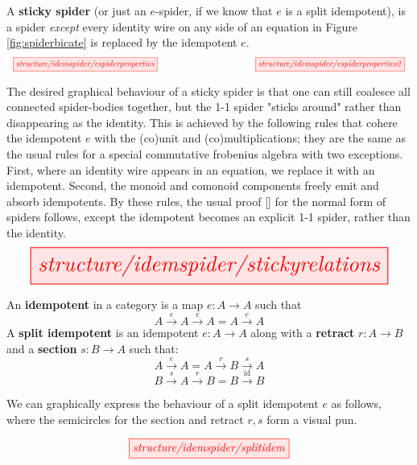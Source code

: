 \begin{myboxB}
\begin{defn}\label{defn:stickyspider}
A \textbf{sticky spider} (or just an $e$-spider, if we know that $e$ is a split idempotent), is a spider \emph{except} every identity wire on any side of an equation in Figure \ref{fig:spiderbicate} is replaced by the idempotent $e$.
\[\scalebox{0.75}{\tikzfig{structure/idemspider/espiderproperties}} \qquad\qquad\qquad\qquad \scalebox{0.75}{\tikzfig{structure/idemspider/espiderproperties2}}\]
\end{defn}

The desired graphical behaviour of a sticky spider is that one can still coalesce all connected spider-bodies together, but the 1-1 spider "sticks around" rather than disappearing as the identity. This is achieved by the following rules that cohere the idempotent $e$ with the (co)unit and (co)multiplications; they are the same as the usual rules for a special commutative frobenius algebra with two exceptions. First, where an identity wire appears in an equation, we replace it with an idempotent. Second, the monoid and comonoid components freely emit and absorb idempotents. By these rules, the usual proof [] for the normal form of spiders follows, except the idempotent becomes an explicit 1-1 spider, rather than the identity.
\[\resizebox{\textwidth}{!}{\tikzfig{structure/idemspider/stickyrelations}}\]
\end{myboxB}

\begin{myboxR}

\begin{rem}
An \textbf{idempotent} in a category is a map $e: A \rightarrow A$ such that \[A \overset{e}{\rightarrow} A \overset{e}{\rightarrow} A = A \overset{e}{\rightarrow} A\]
A \textbf{split idempotent} is an idempotent $e: A \rightarrow A$ along with a \textbf{retract} $r: A \rightarrow B$ and a \textbf{section} $s: B \rightarrow A$ such that:
\[A \overset{e}{\rightarrow} A = A \overset{r}{\rightarrow} B \overset{s}{\rightarrow} A\]
\[B \overset{s}{\rightarrow} A \overset{r}{\rightarrow} B = B \overset{\mathop{id}}{\rightarrow} B\]
\end{rem}

We can graphically express the behaviour of a split idempotent $e$ as follows, where the semicircles for the section and retract $r,s$ form a visual pun.

\[\scalebox{1}{\tikzfig{structure/idemspider/splitidem}}\]
\end{myboxR}

